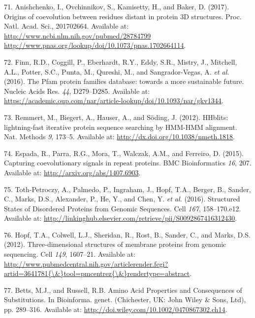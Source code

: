 \documentclass[12pt,a4paper,twoside]{book}
\theoremstyle{definition}
\theoremstyle{definition}
\theoremstyle{remark}
\begin{document}
\hypertarget{ref-Anishchenko2017}{}
71. Anishchenko, I., Ovchinnikov, S., Kamisetty, H., and Baker, D.
(2017). Origins of coevolution between residues distant in protein 3D
structures. Proc. Natl. Acad. Sci., 201702664. Available at:
\href{http://www.ncbi.nlm.nih.gov/pubmed/28784799\%20http://www.pnas.org/lookup/doi/10.1073/pnas.1702664114}{http://www.ncbi.nlm.nih.gov/pubmed/28784799 http://www.pnas.org/lookup/doi/10.1073/pnas.1702664114}.

\hypertarget{ref-Finn2016}{}
72. Finn, R.D., Coggill, P., Eberhardt, R.Y., Eddy, S.R., Mistry, J.,
Mitchell, A.L., Potter, S.C., Punta, M., Qureshi, M., and
Sangrador-Vegas, A. \emph{et al.} (2016). The Pfam protein families
database: towards a more sustainable future. Nucleic Acids Res.
\emph{44}, D279--D285. Available at:
\url{https://academic.oup.com/nar/article-lookup/doi/10.1093/nar/gkv1344}.

\hypertarget{ref-Remmert2012}{}
73. Remmert, M., Biegert, A., Hauser, A., and Söding, J. (2012).
HHblits: lightning-fast iterative protein sequence searching by HMM-HMM
alignment. Nat. Methods \emph{9}, 173--5. Available at:
\url{http://dx.doi.org/10.1038/nmeth.1818}.

\hypertarget{ref-Espada2014}{}
74. Espada, R., Parra, R.G., Mora, T., Walczak, A.M., and Ferreiro, D.
(2015). Capturing coevolutionary signals in repeat proteins. BMC
Bioinformatics \emph{16}, 207. Available at:
\url{http://arxiv.org/abs/1407.6903}.

\hypertarget{ref-Toth-Petroczy2016}{}
75. Toth-Petroczy, A., Palmedo, P., Ingraham, J., Hopf, T.A., Berger,
B., Sander, C., Marks, D.S., Alexander, P., He, Y., and Chen, Y.
\emph{et al.} (2016). Structured States of Disordered Proteins from
Genomic Sequences. Cell \emph{167}, 158--170.e12. Available at:
\url{http://linkinghub.elsevier.com/retrieve/pii/S0092867416312430}.

\hypertarget{ref-Hopf2012}{}
76. Hopf, T.A., Colwell, L.J., Sheridan, R., Rost, B., Sander, C., and
Marks, D.S. (2012). Three-dimensional structures of membrane proteins
from genomic sequencing. Cell \emph{149}, 1607--21. Available at:
\href{http://www.pubmedcentral.nih.gov/articlerender.fcgi?artid=3641781\%7B/\&\%7Dtool=pmcentrez\%7B/\&\%7Drendertype=abstract}{http://www.pubmedcentral.nih.gov/articlerender.fcgi?artid=3641781\{\textbackslash{}\&\}tool=pmcentrez\{\textbackslash{}\&\}rendertype=abstract}.

\hypertarget{ref-Bettsa}{}
77. Betts, M.J., and Russell, R.B. Amino Acid Properties and
Consequences of Substitutions. In Bioinforma. genet. (Chichester, UK:
John Wiley \& Sons, Ltd), pp. 289--316. Available at:
\url{http://doi.wiley.com/10.1002/0470867302.ch14}.
\end{document}
